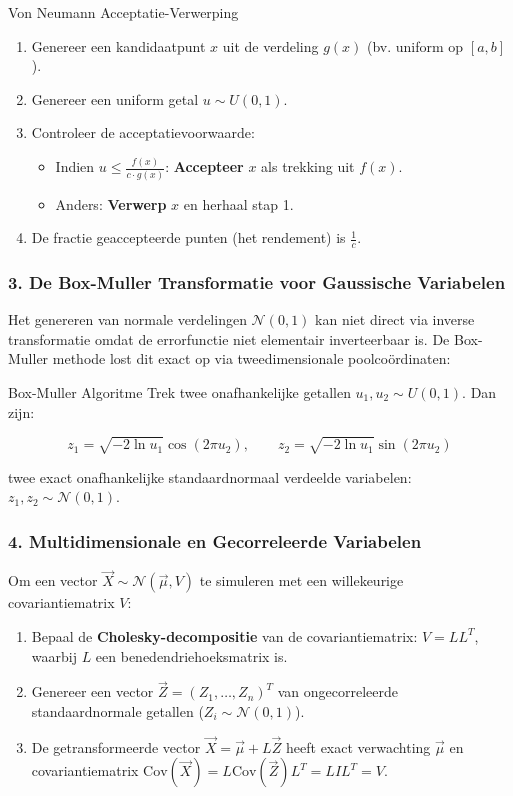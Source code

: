 \documentclass[11pt,a4paper]{article}
\newcommand{\Cov}{\text{Cov}}
\newcommand{\normdist}{\mathcal{N}}
\begin{document}
\begin{stappenplan}{Von Neumann Acceptatie-Verwerping}
\begin{enumerate}[leftmargin=1.2em]
    \item Genereer een kandidaatpunt $x$ uit de verdeling $g(x)$ (bv. uniform op $[a, b]$).
    \item Genereer een uniform getal $u \sim U(0, 1)$.
    \item Controleer de acceptatievoorwaarde:
    \begin{itemize}
        \item Indien $u \le \frac{f(x)}{c \cdot g(x)}$: \textbf{Accepteer} $x$ als trekking uit $f(x)$.
        \item Anders: \textbf{Verwerp} $x$ en herhaal stap 1.
    \end{itemize}
    \item De fractie geaccepteerde punten (het rendement) is $\frac{1}{c}$.
\end{enumerate}
\end{stappenplan}

\subsubsection{3. De Box-Muller Transformatie voor Gaussische Variabelen}
Het genereren van normale verdelingen $\normdist(0, 1)$ kan niet direct via inverse transformatie omdat de errorfunctie niet elementair inverteerbaar is. De Box-Muller methode lost dit exact op via tweedimensionale poolcoördinaten:
\begin{theobox}{Box-Muller Algoritme}
Trek twee onafhankelijke getallen $u_1, u_2 \sim U(0, 1)$. Dan zijn:
\begin{formulabox}
\begin{equation}
    z_1 = \sqrt{-2\ln u_1} \cos(2\pi u_2), \qquad z_2 = \sqrt{-2\ln u_1} \sin(2\pi u_2)
\end{equation}
\end{formulabox}
twee exact onafhankelijke standaardnormaal verdeelde variabelen: $z_1, z_2 \sim \normdist(0, 1)$.
\end{theobox}

\subsubsection{4. Multidimensionale en Gecorreleerde Variabelen}
Om een vector $\vec{X} \sim \normdist(\vec{\mu}, V)$ te simuleren met een willekeurige covariantiematrix $V$:
\begin{enumerate}[leftmargin=1.2em]
    \item Bepaal de \textbf{Cholesky-decompositie} van de covariantiematrix: $V = L L^T$, waarbij $L$ een benedendriehoeksmatrix is.
    \item Genereer een vector $\vec{Z} = (Z_1, \ldots, Z_n)^T$ van ongecorreleerde standaardnormale getallen ($Z_i \sim \normdist(0, 1)$).
    \item De getransformeerde vector $\vec{X} = \vec{\mu} + L \vec{Z}$ heeft exact verwachting $\vec{\mu}$ en covariantiematrix $\Cov(\vec{X}) = L \Cov(\vec{Z}) L^T = L I L^T = V$.
\end{enumerate}
\end{document}

